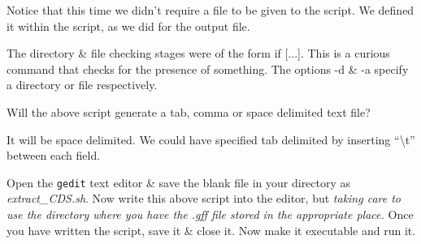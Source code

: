 Notice that this time we didn't require a file to be given to the script.
We defined it within the script, as we did for the output file.

\begin{information}
The directory \& file checking stages were of the form if [...].
This is a curious command that checks for the presence of something. 
The options -d \& -a specify a directory or file respectively.
\end{information}

\begin{questions}
Will the above script generate a tab, comma or space delimited text file? \\
\begin{answer}
It will be space delimited. 
We could have specified tab delimited by inserting ``\textbackslash t'' between each field.
\end{answer}
\end{questions}

\begin{steps}
Open the \texttt{gedit} text editor \& save the blank file in your directory as \textit{extract\_CDS.sh}.
Now write this above script into the editor, but \textit{taking care to use the directory where you have the .gff file stored in the appropriate place.}
Once you have written the script, save it \& close it.
Now make it executable and run it.\\
\end{steps}


